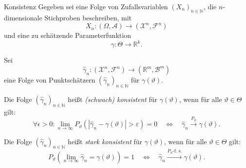 \begin{defi}{Konsistenz}
    Gegeben sei eine Folge von Zufallsvariablen $(X_n)_{n \in \mathbb{N}}$, die $n$-dimensionale Stichproben beschreiben, mit
    \[
        X_n: (\Omega, \mathcal{A}) \to (\mathcal{X}^n, \mathcal{F}^n)
    \]
    und eine zu schätzende Parameterfunktion
    \[
        \gamma: \Theta \to \mathbb{R}^k.
    \]

    Sei
    \[
        \hat{\gamma}_n: (\mathcal{X}^n, \mathcal{F}^n) \to (\mathbb{R}^m, \mathcal{B}^m)
    \]
    eine Folge von Punktschätzern $(\hat{\gamma}_n)_{n \in \mathbb{N}}$ für $\gamma(\vartheta)$.

    Die Folge $(\hat{\gamma}_n)_{n \in \mathbb{N}}$ heißt \emph{(schwach) konsistent} für $\gamma(\vartheta)$, wenn für alle $\vartheta \in \Theta$ gilt:
    \[
        \forall \epsilon > 0 : \lim_{n\to\infty} P_{\vartheta} (|\hat{\gamma}_n - \gamma(\vartheta)| > \varepsilon) = 0 \quad \iff \quad \hat{\gamma}_n \xrightarrow{P_{\vartheta}} \gamma(\vartheta).
    \]

    Die Folge $(\hat{\gamma}_n)_{n \in \mathbb{N}}$ heißt \emph{stark konsistent} für $\gamma(\vartheta)$, wenn für alle $\vartheta \in \Theta$ gilt:
    \[
        P_{\vartheta} \left( \lim_{n\to\infty} \hat{\gamma}_n = \gamma(\vartheta) \right) = 1 \quad \iff \quad \hat{\gamma}_n \xrightarrow{P_{\vartheta}\text{-f. s.}} \gamma(\vartheta).
    \]
\end{defi}

